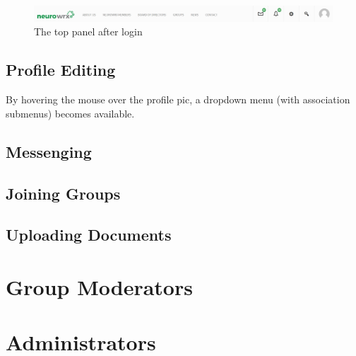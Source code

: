 \documentclass[10pt]{article}
\begin{document}
\begin{figure}[h]
    \centering
    \includegraphics[scale=0.3]{images/topbarlogged.jpg}
    \caption{The top panel after login}
    \label{topbarlogged}
\end{figure}

\subsection{Profile Editing}

\begin{flushleft}
By hovering the mouse over the profile pic, a dropdown menu (with association submenus) becomes available.   
\end{flushleft}




\subsection{Messenging}
\subsection{Joining Groups}
\subsection{Uploading Documents}

\section{Group Moderators}
\section{Administrators}




\end{document}
